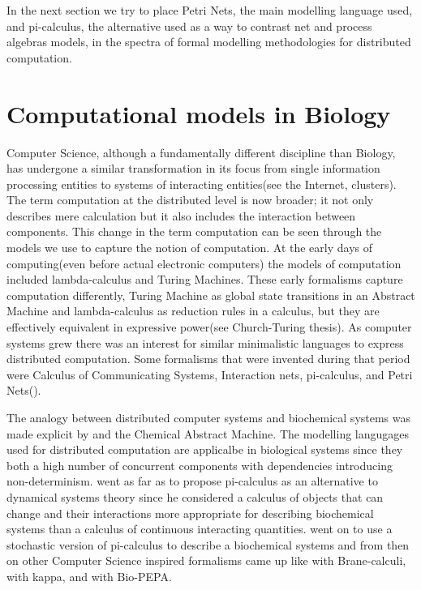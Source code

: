 In the next section we try to place Petri Nets, the main modelling
language used, and pi-calculus, the alternative used as a way to
contrast net and process algebras models, in the spectra of formal
modelling methodologies for distributed computation.

\section{Computational models in Biology}
Computer Science, although a fundamentally different discipline than
Biology, has undergone a similar transformation in its focus from
single information processing entities to systems of interacting
entities(see the Internet, clusters). The term computation at the
distributed level is now broader; it not only describes mere
calculation but it also includes the interaction between
components. This change in the term computation can be seen through
the models we use to capture the notion of computation. At the early
days of computing(even before actual electronic computers) the models
of computation included lambda-calculus and Turing Machines. These
early formalisms capture computation differently, Turing Machine as
global state transitions in an Abstract Machine and lambda-calculus
as reduction rules in a calculus, but they are effectively equivalent
in expressive power(see Church-Turing thesis). As computer systems
grew there was an interest for similar
minimalistic languages to express distributed computation. Some
formalisms that were invented during that period were
\citet{milner1980calculus} Calculus of Communicating Systems,
\citet{lafont1989interaction} Interaction nets,
\citet{milner1992calculus} pi-calculus, and Petri
Nets(\citet{murata1989petri}). 

The analogy between distributed computer systems and biochemical
systems was made explicit by \citet{berry1989chemical} and the
Chemical Abstract Machine. The modelling langugages used for
distributed computation are applicalbe in biological systems since
they both a high number of concurrent components with dependencies
introducing non-determinism. \citet{fontana1996barrier} went as far as
to propose pi-calculus as an alternative to dynamical systems
theory since he considered a calculus of objects that can change and their
interactions more appropriate for describing biochemical systems than a calculus of continuous
interacting quantities. \citet{priami2001application} went on to use a
stochastic version of pi-calculus to describe a biochemical systems
and from then on other Computer Science inspired formalisms came up like
\citet{cardelli2005brane} with Brane-calculi, \citet{danos2004formal}
with kappa, and
\citet{ciocchetta2009bio} with Bio-PEPA. 

